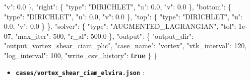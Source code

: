 \documentclass[
  10pt,
]{article}
\newenvironment{Shaded}{}{}
\newcommand{\DataTypeTok}[1]{\textcolor[rgb]{0.56,0.13,0.00}{#1}}
\newcommand{\DecValTok}[1]{\textcolor[rgb]{0.25,0.63,0.44}{#1}}
\newcommand{\FloatTok}[1]{\textcolor[rgb]{0.25,0.63,0.44}{#1}}
\newcommand{\FunctionTok}[1]{\textcolor[rgb]{0.02,0.16,0.49}{#1}}
\newcommand{\KeywordTok}[1]{\textcolor[rgb]{0.00,0.44,0.13}{\textbf{#1}}}
\newcommand{\StringTok}[1]{\textcolor[rgb]{0.25,0.44,0.63}{#1}}
\providecommand{\tightlist}{%
  \setlength{\itemsep}{0pt}\setlength{\parskip}{0pt}}
\begin{document}
\begin{Shaded}
\begin{Highlighting}[]
      \DataTypeTok{"v"}\FunctionTok{:} \FloatTok{0.0}
    \FunctionTok{\},}
    \DataTypeTok{"right"}\FunctionTok{:} \FunctionTok{\{}
      \DataTypeTok{"type"}\FunctionTok{:} \StringTok{"DIRICHLET"}\FunctionTok{,}
      \DataTypeTok{"u"}\FunctionTok{:} \FloatTok{0.0}\FunctionTok{,}
      \DataTypeTok{"v"}\FunctionTok{:} \FloatTok{0.0}
    \FunctionTok{\},}
    \DataTypeTok{"bottom"}\FunctionTok{:} \FunctionTok{\{}
      \DataTypeTok{"type"}\FunctionTok{:} \StringTok{"DIRICHLET"}\FunctionTok{,}
      \DataTypeTok{"u"}\FunctionTok{:} \FloatTok{0.0}\FunctionTok{,}
      \DataTypeTok{"v"}\FunctionTok{:} \FloatTok{0.0}
    \FunctionTok{\},}
    \DataTypeTok{"top"}\FunctionTok{:} \FunctionTok{\{}
      \DataTypeTok{"type"}\FunctionTok{:} \StringTok{"DIRICHLET"}\FunctionTok{,}
      \DataTypeTok{"u"}\FunctionTok{:} \FloatTok{0.0}\FunctionTok{,}
      \DataTypeTok{"v"}\FunctionTok{:} \FloatTok{0.0}
    \FunctionTok{\}}
  \FunctionTok{\},}
  \DataTypeTok{"solver"}\FunctionTok{:} \FunctionTok{\{}
    \DataTypeTok{"type"}\FunctionTok{:} \StringTok{"AUGMENTED\_LAGRANGIAN"}\FunctionTok{,}
    \DataTypeTok{"tol"}\FunctionTok{:} \DecValTok{1e{-}07}\FunctionTok{,}
    \DataTypeTok{"max\_iter"}\FunctionTok{:} \DecValTok{500}\FunctionTok{,}
    \DataTypeTok{"r\_al"}\FunctionTok{:} \FloatTok{500.0}
  \FunctionTok{\},}
  \DataTypeTok{"output"}\FunctionTok{:} \FunctionTok{\{}
    \DataTypeTok{"output\_dir"}\FunctionTok{:} \StringTok{"output\_vortex\_shear\_ciam\_plic"}\FunctionTok{,}
    \DataTypeTok{"case\_name"}\FunctionTok{:} \StringTok{"vortex"}\FunctionTok{,}
    \DataTypeTok{"vtk\_interval"}\FunctionTok{:} \DecValTok{120}\FunctionTok{,}
    \DataTypeTok{"log\_interval"}\FunctionTok{:} \DecValTok{100}\FunctionTok{,}
    \DataTypeTok{"write\_csv\_history"}\FunctionTok{:} \KeywordTok{true}
  \FunctionTok{\}}
\FunctionTok{\}}
\end{Highlighting}
\end{Shaded}

\begin{itemize}
\tightlist
\item
  \textbf{\texttt{cases/vortex\_shear\_ciam\_elvira.json}} :
\end{itemize}
\end{document}
